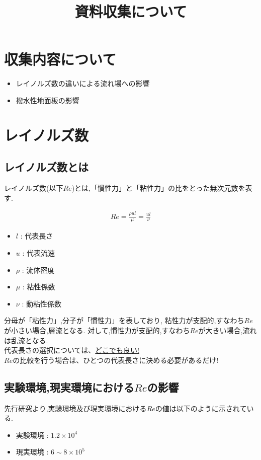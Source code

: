 \documentclass[twocolumn,a4j]{jsarticle}
\author{}
\title{資料収集について}
\date{}
\begin{document}
\maketitle
\section{\large 収集内容について}
\begin{itemize}
    \item レイノルズ数の違いによる流れ場への影響
    \item 撥水性地面板の影響
\end{itemize}
\section{\large レイノルズ数}
\subsection{レイノルズ数とは}
レイノルズ数(以下$Re$)とは,「慣性力」と「粘性力」の比をとった無次元数を表す.
\begin{framed}
    \begin{eqnarray*}
        Re=\frac{\rho u l}{\mu}=\frac{u l}{\nu}
    \end{eqnarray*}
\end{framed}
\begin{itemize}
    \item $l$ : 代表長さ
    \item $u$ : 代表流速
    \item $\rho$ : 流体密度
    \item $\mu$ : 粘性係数
    \item $\nu$ : 動粘性係数
\end{itemize}
\par
分母が「粘性力」,分子が「慣性力」を表しており,
粘性力が支配的,すなわち$Re$が小さい場合,層流となる.
対して,慣性力が支配的,すなわち$Re$が大きい場合,流れは乱流となる.
\\
\textreferencemark 代表長さの選択については、\underline{どこでも良い!}\\
$Re$の比較を行う場合は、ひとつの代表長さに決める必要があるだけ!
\\
\subsection{実験環境,現実環境における$Re$の影響}
先行研究より,実験環境及び現実環境における$Re$の値は以下のように示されている.
\begin{itemize}
    \item 実験環境 : $1.2 × 10^4$
    \item 現実環境 : $6 \sim 8 × 10^5$
\end{itemize}
\end{document}
